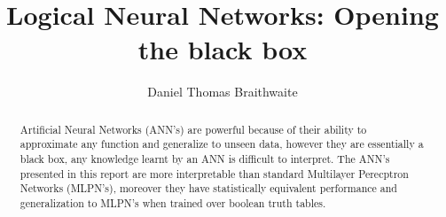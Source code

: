 \documentclass[11pt
              , a4paper
              , openright
              ]{report}
\title{Logical Neural Networks: Opening the black box}
\author{Daniel Thomas Braithwaite}
\date{}
\theoremstyle{definition}
\begin{document}
\frontmatter



\begin{abstract}

Artificial Neural Networks (ANN's) are powerful because of their ability to approximate any function and generalize to unseen data, however they are essentially a black box, any knowledge learnt by an ANN is difficult to interpret. The ANN's presented in this report are more interpretable than standard Multilayer Perecptron Networks (MLPN's), moreover they have statistically equivalent performance and generalization to MLPN's when trained over boolean truth tables.

\end{abstract}


\maketitle

%

\tableofcontents



\mainmatter











\backmatter



%




\end{document}
